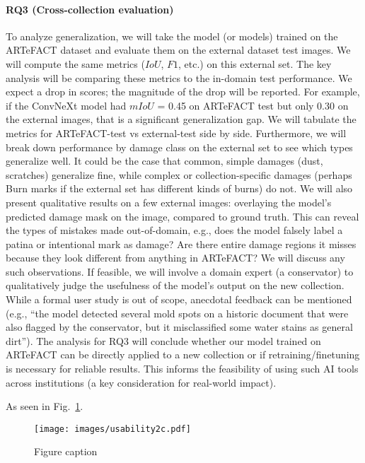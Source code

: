 \documentclass[conference]{IEEEtran}
\begin{document}
\paragraph*{RQ3 (Cross-collection evaluation)} To analyze generalization, we will take the model (or models) trained on the ARTeFACT dataset and evaluate them on the external dataset test images. We will compute the same metrics ($IoU$, $F1$, etc.) on this external set. The key analysis will be comparing these metrics to the in-domain test performance. We expect a drop in scores; the magnitude of the drop will be reported. For example, if the ConvNeXt model had $mIoU$ = 0.45 on ARTeFACT test but only 0.30 on the external images, that is a significant generalization gap. We will tabulate the metrics for ARTeFACT-test vs external-test side by side. Furthermore, we will break down performance by damage class on the external set to see which types generalize well. It could be the case that common, simple damages (dust, scratches) generalize fine, while complex or collection-specific damages (perhaps Burn marks if the external set has different kinds of burns) do not. We will also present qualitative results on a few external images: overlaying the model's predicted damage mask on the image, compared to ground truth. This can reveal the types of mistakes made out-of-domain, e.g., does the model falsely label a patina or intentional mark as damage? Are there entire damage regions it misses because they look different from anything in ARTeFACT? We will discuss any such observations. If feasible, we will involve a domain expert (a conservator) to qualitatively judge the usefulness of the model's output on the new collection. While a formal user study is out of scope, anecdotal feedback can be mentioned (e.g., “the model detected several mold spots on a historic document that were also flagged by the conservator, but it misclassified some water stains as general dirt”). The analysis for RQ3 will conclude whether our model trained on ARTeFACT can be directly applied to a new collection or if retraining/finetuning is necessary for reliable results. This informs the feasibility of using such AI tools across institutions (a key consideration for real-world impact).



As seen in Fig.~\ref{fig:figname}.

\begin{figure}
    \centering
    \texttt{[image: images/usability2c.pdf]}
    \vspace*{-5mm}\caption{Figure caption}
    \label{fig:figname}
\end{figure}
\end{document}
